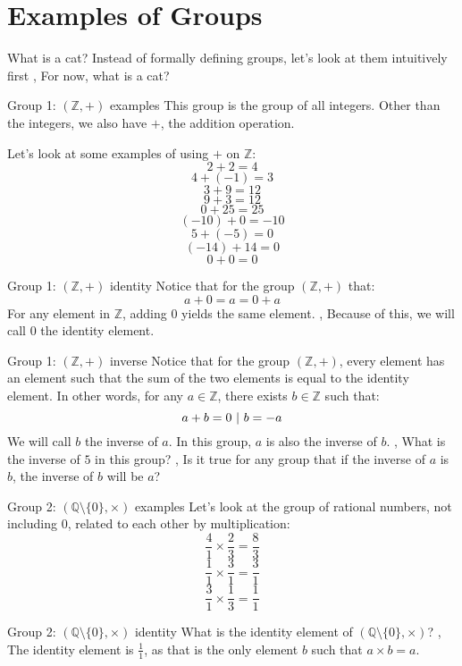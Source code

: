 \section{Examples of Groups}
\begin{namedframe}{What is a cat?}
	Instead of formally defining groups, let's look at them intuitively first
	\sep
	For now, what is a cat?
\end{namedframe}
\begin{namedframe}{Group 1: $(\mathbb{Z}, +)$ examples}
	This group is the group of all integers. Other than the integers, we also have $+$, the addition operation.

	Let's look at some examples of using $+$ on $\mathbb{Z}$:
	\[2 + 2 = 4\]
	\[4 + (-1) = 3\]
	\[3 + 9 = 12\]
	\[9 + 3 = 12\]
	\[0 + 25 = 25\]
	\[(-10) + 0 = -10\]
	\[5 + (-5) = 0\]
	\[(-14) + 14 = 0\]
	\[0 + 0 = 0\]
\end{namedframe}
\begin{namedframe}{Group 1: $(\mathbb{Z}, +)$ identity}
	Notice that for the group $(\mathbb{Z}, +)$ that:
	\[a + 0 = a = 0 + a\]
	For any element in $\mathbb{Z}$, adding $0$ yields the same element.
	\sep
	Because of this, we will call $0$ the identity element.
\end{namedframe}
\begin{namedframe}{Group 1: $(\mathbb{Z}, +)$ inverse}
	Notice that for the group $(\mathbb{Z}, +)$, every element has an element such that the sum of the two elements is equal to the identity element.
	\vertspace
	In other words, for any $a \in \mathbb{Z}$, there exists $b \in \mathbb{Z}$ such that:
	\[a + b = 0 \ |\  b = -a\]
	We will call $b$ the inverse of $a$. In this group, $a$ is also the inverse of $b$.
	\sep
	What is the inverse of $5$ in this group?
	\sep
	Is it true for any group that if the inverse of $a$ is $b$, the inverse of $b$ will be $a$?
\end{namedframe}
\begin{namedframe}{Group 2: $(\mathbb{Q} \setminus \{0\}, \times)$ examples}
	Let's look at the group of rational numbers, not including $0$, related to each other by multiplication:
	\[\frac{4}{1} \times \frac{2}{3} = \frac{8}{3}\]
	\[\frac{1}{1} \times \frac{3}{1} = \frac{3}{1}\]
	\[\frac{3}{1} \times \frac{1}{3} = \frac{1}{1}\]
\end{namedframe}
\begin{namedframe}{Group 2: $(\mathbb{Q} \setminus \{0\}, \times)$ identity}
	What is the identity element of $(\mathbb{Q} \setminus \{0\}, \times)$?
	\sep
	The identity element is $\frac{1}{1}$, as that is the only element $b$ such that $a \times b = a$.
\end{namedframe}
